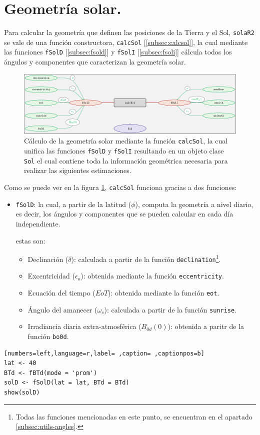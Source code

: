\section{Geometría solar.}
\label{sec:org4e62b37}
\label{sec:geometria-solar}
Para calcular la geometría que definen las posiciones de la Tierra y el Sol, \texttt{solaR2} se vale de una función constructora, \texttt{calcSol} [\ref{subsec:calcsol}], la cual mediante las funciones \texttt{fSolD} [\ref{subsec:fsold}] y \texttt{fSolI} [\ref{subsec:fsoli}] cálcula todos los ángulos y componentes que caracterizan la geometría solar.
\begin{figure}[]
\centering
\includegraphics[keepaspectratio,width=\textwidth,height=0.5\textheight]{figuras/calcSol.pdf}
\caption{Cálculo de la geometría solar mediante la función \texttt{calcSol}, la cual unifica las funciones \texttt{fSolD} y \texttt{fSolI} resultando en un objeto clase \texttt{Sol} el cual contiene toda la información geométrica necesaria para realizar las siguientes estimaciones. \label{fig:calcSol}}
\end{figure}
Como se puede ver en la figura \ref{fig:calcSol}, \texttt{calcSol} funciona gracias a dos funciones:
\begin{itemize}
\item \texttt{fSolD}: la cual, a partir de la latitud (\(\phi\)), computa la geometría a nivel diario, es decir, los ángulos y componentes que se pueden calcular en cada día independiente.

estas son:
\begin{itemize}
\item Declinación (\(\delta\)): calculada a partir de la función \texttt{declination}\footnote{Todas las funciones mencionadas en este punto, se encuentran en el apartado \ref{subsec:utils-angles}.}.
\item Excentricidad (\(\epsilon_o\)): obtenida mediante la función \texttt{eccentricity}.
\item Ecuación del tiempo (\(EoT\)): obtenida mediante la función \texttt{eot}.
\item Ángulo del amanecer (\(\omega_s\)): calculada a partir de la función \texttt{sunrise}.
\item Irradiancia diaria extra-atmosférica (\(B_{0d}(0)\)): obtenida a paritr de la función \texttt{bo0d}.
\end{itemize}
\end{itemize}
\begin{lstlisting}[numbers=left,language=r,label= ,caption= ,captionpos=b]
lat <- 40
BTd <- fBTd(mode = 'prom')
solD <- fSolD(lat = lat, BTd = BTd)
show(solD)
\end{lstlisting}

